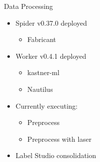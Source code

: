 \begin{frame}{Data Processing}
    \begin{itemize}
        \item Spider v0.37.0 deployed
        \begin{itemize}
            \item Fabricant
        \end{itemize}
        \item Worker v0.4.1 deployed
        \begin{itemize}
            \item kastner-ml
            \item Nautilus
        \end{itemize}
        \item Currently executing:
        \begin{itemize}
            \item Preprocess
            \item Preprocess with laser
        \end{itemize}
        \item Label Studio consolidation
    \end{itemize}
\end{frame}
